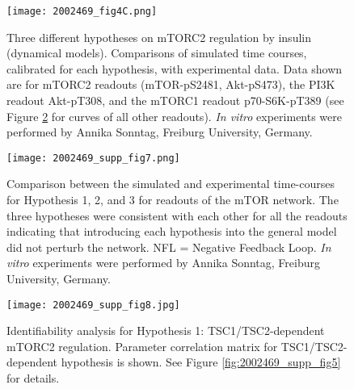 \begin{figure}[tb]
	\begin{center}
		\texttt{[image: 2002469\_fig4C.png]}
		\caption[Three different hypotheses on mTORC2 regulation by insulin (dynamical models)]{Three different hypotheses on mTORC2 regulation by insulin (dynamical models). Comparisons of simulated time courses, calibrated for each hypothesis, with experimental data. Data shown are for mTORC2 readouts (mTOR-pS2481, Akt-pS473), the PI3K readout Akt-pT308, and the mTORC1 readout p70-S6K-pT389 (see Figure \ref{fig:2002469_supp_fig7} for curves of all other readouts). \emph{In vitro} experiments were performed by Annika Sonntag, Freiburg University, Germany.}
		\label{fig:2002469_fig4C}
	\end{center}
\end{figure}
\clearpage

\begin{figure}[tb]
	\begin{center}
		\texttt{[image: 2002469\_supp\_fig7.png]}
		\caption[Comparison between the simulated and experimental time-courses for Hypotheses 1, 2, and 3 for readouts of the mTOR network]{Comparison between the simulated and experimental time-courses for Hypothesis 1, 2, and 3 for readouts of the mTOR network. The three hypotheses were consistent with each other for all the readouts indicating that introducing each hypothesis into the general model did not perturb the network. NFL = Negative Feedback Loop. \emph{In vitro} experiments were performed by Annika Sonntag, Freiburg University, Germany.}
		\label{fig:2002469_supp_fig7}
	\end{center}
\end{figure}
\clearpage

\begin{figure}[tb]
	\begin{center}
		\texttt{[image: 2002469\_supp\_fig8.jpg]}
		\caption[Identifiability analysis for Hypothesis 1: TSC1/TSC2-dependent mTORC2 regulation]{Identifiability analysis for Hypothesis 1: TSC1/TSC2-dependent mTORC2 regulation. Parameter correlation matrix for TSC1/TSC2-dependent hypothesis is shown. See Figure \ref{fig:2002469_supp_fig5} for details.}
		\label{fig:2002469_supp_fig8}
	\end{center}
\end{figure}
\clearpage

